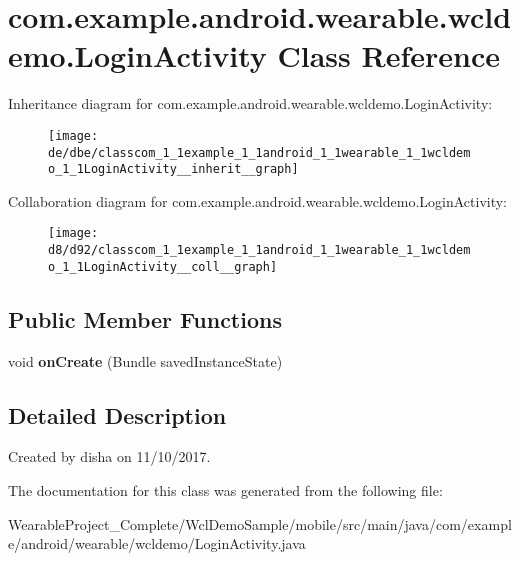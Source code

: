 \hypertarget{classcom_1_1example_1_1android_1_1wearable_1_1wcldemo_1_1LoginActivity}{}\section{com.\+example.\+android.\+wearable.\+wcldemo.\+Login\+Activity Class Reference}
\label{classcom_1_1example_1_1android_1_1wearable_1_1wcldemo_1_1LoginActivity}


Inheritance diagram for com.\+example.\+android.\+wearable.\+wcldemo.\+Login\+Activity\+:\nopagebreak
\begin{figure}[H]
\begin{center}
\leavevmode
\texttt{[image: de/dbe/classcom\_1\_1example\_1\_1android\_1\_1wearable\_1\_1wcldemo\_1\_1LoginActivity\_\_inherit\_\_graph]}
\end{center}
\end{figure}


Collaboration diagram for com.\+example.\+android.\+wearable.\+wcldemo.\+Login\+Activity\+:\nopagebreak
\begin{figure}[H]
\begin{center}
\leavevmode
\texttt{[image: d8/d92/classcom\_1\_1example\_1\_1android\_1\_1wearable\_1\_1wcldemo\_1\_1LoginActivity\_\_coll\_\_graph]}
\end{center}
\end{figure}
\subsection*{Public Member Functions}
\begin{DoxyCompactItemize}
\item 
void {\bfseries on\+Create} (Bundle saved\+Instance\+State)\hypertarget{classcom_1_1example_1_1android_1_1wearable_1_1wcldemo_1_1LoginActivity_aafe9ff9417111e9a2af9b523616e7c16}{}\label{classcom_1_1example_1_1android_1_1wearable_1_1wcldemo_1_1LoginActivity_aafe9ff9417111e9a2af9b523616e7c16}

\end{DoxyCompactItemize}


\subsection{Detailed Description}
Created by disha on 11/10/2017. 

The documentation for this class was generated from the following file\+:\begin{DoxyCompactItemize}
\item 
Wearable\+Project\+\_\+\+Complete/\+Wcl\+Demo\+Sample/mobile/src/main/java/com/example/android/wearable/wcldemo/Login\+Activity.\+java\end{DoxyCompactItemize}

